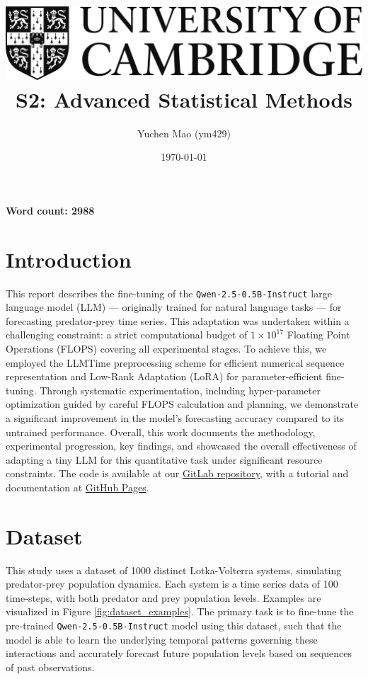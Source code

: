 \documentclass{article}
\title{
    \includegraphics[scale=0.2]{Images/cam_logo_bw.png}\\ %
    \vspace{0.5cm}
    S2: Advanced Statistical Methods
}
\author{Yuchen Mao (ym429)}
\affil{Department of Physics, University of Cambridge}
\date{\today}
\begin{document}
\maketitle
\noindent\textbf{Word count: 2988}
\tableofcontents
{}

\newpage


\section{Introduction}
\label{sec:introduction}

This report describes the fine-tuning of the \texttt{Qwen-2.5-0.5B-Instruct} large language model \cite{qwen2025qwen25technicalreport} (LLM) — originally trained for natural language tasks — for forecasting predator-prey time series. This adaptation was undertaken within a challenging constraint: a strict computational budget of $1 \times 10^{17}$ Floating Point Operations (FLOPS) covering all experimental stages. To achieve this, we employed the LLMTime preprocessing scheme \cite{gruver2024largelanguagemodelszeroshot} for efficient numerical sequence representation and Low-Rank Adaptation (LoRA) \cite{hu2021loralowrankadaptationlarge} for parameter-efficient fine-tuning. Through systematic experimentation, including hyper-parameter optimization guided by careful FLOPS calculation and planning, we demonstrate a significant improvement in the model's forecasting accuracy compared to its untrained performance. Overall, this work documents the methodology, experimental progression, key findings, and showcased the overall effectiveness of adapting a tiny LLM for this quantitative task under significant resource constraints. The code is available at our \href{https://gitlab.developers.cam.ac.uk/phy/data-intensive-science-mphil/assessments/m2_coursework/ym429}{GitLab repository}, with a tutorial and documentation at \href{https://yuchen20.github.io/M2-Coursework/}{GitHub Pages}.

\section{Dataset}
\label{sec:dataset}

This study uses a dataset of 1000 distinct Lotka-Volterra systems, simulating predator-prey population dynamics. Each system is a time series data of 100 time-steps, with both predator and prey population levels. Examples are visualized in Figure \ref{fig:dataset_examples}. The primary task is to fine-tune the pre-trained \texttt{Qwen-2.5-0.5B-Instruct} model using this dataset, such that the model is able to learn the underlying temporal patterns governing these interactions and accurately forecast future population levels based on sequences of past observations.
\end{document}
